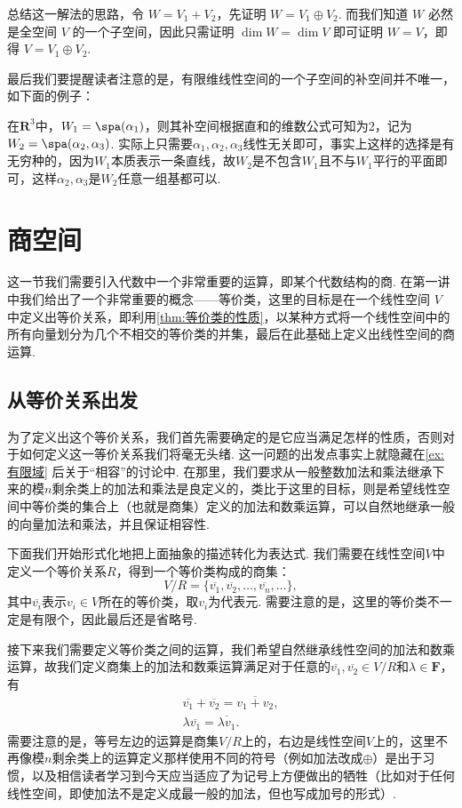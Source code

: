 总结这一解法的思路，令 $W = V_1 + V_2$，先证明 $W = V_1 \oplus V_2$. 而我们知道 $W$ 必然是全空间 $V$ 的一个子空间，因此只需证明 $\dim W = \dim V$ 即可证明 $W = V$，即得 $V = V_1 \oplus V_2$.

最后我们要提醒读者注意的是，有限维线性空间的一个子空间的补空间并不唯一，如下面的例子：
\begin{example}{}{}
    在$\mathbf{R}^3$中，$W_1=\spa(\alpha_1)$，则其补空间根据直和的维数公式可知为2，记为$W_2=\spa(\alpha_2,\alpha_3)$. 实际上只需要$\alpha_1,\alpha_2,\alpha_3$线性无关即可，事实上这样的选择是有无穷种的，因为$W_1$本质表示一条直线，故$W_2$是不包含$W_1$且不与$W_1$平行的平面即可，这样$\alpha_2,\alpha_3$是$W_2$任意一组基都可以.
\end{example}

\section{商空间}

这一节我们需要引入代数中一个非常重要的运算，即某个代数结构的商. 在第一讲中我们给出了一个非常重要的概念——等价类，这里的目标是在一个线性空间 $V$ 中定义出等价关系，即利用\autoref{thm:等价类的性质}，以某种方式将一个线性空间中的所有向量划分为几个不相交的等价类的并集，最后在此基础上定义出线性空间的商运算.

\subsection{从等价关系出发}

为了定义出这个等价关系，我们首先需要确定的是它应当满足怎样的性质，否则对于如何定义这一等价关系我们将毫无头绪. 这一问题的出发点事实上就隐藏在\autoref{ex:有限域} 后关于``相容''的讨论中. 在那里，我们要求从一般整数加法和乘法继承下来的模$n$剩余类上的加法和乘法是良定义的，类比于这里的目标，则是希望线性空间中等价类的集合上（也就是商集）定义的加法和数乘运算，可以自然地继承一般的向量加法和乘法，并且保证相容性.

下面我们开始形式化地把上面抽象的描述转化为表达式. 我们需要在线性空间$V$中定义一个等价关系$R$，得到一个等价类构成的商集：
\[V/R=\{\overline{v_1},\overline{v_2},\ldots,\overline{v_n},\ldots\},\]
其中$\overline{v_i}$表示$v_i\in V$所在的等价类，取$v_i$为代表元. 需要注意的是，这里的等价类不一定是有限个，因此最后还是省略号.

接下来我们需要定义等价类之间的运算，我们希望自然继承线性空间的加法和数乘运算，故我们定义商集上的加法和数乘运算满足对于任意的$\overline{v_1},\overline{v_2}\in V/R$和$\lambda\in\mathbf{F}$，有
\begin{equation} \label{eq:10:商集运算}
    \begin{gathered}
        \overline{v_1}+\overline{v_2}=\overline{v_1+v_2},\\
        \lambda\overline{v_1}=\overline{\lambda v_1}.
    \end{gathered}
\end{equation}
需要注意的是，等号左边的运算是商集$V/R$上的，右边是线性空间$V$上的，这里不再像模$n$剩余类上的运算定义那样使用不同的符号（例如加法改成$\oplus$）是出于习惯，以及相信读者学习到今天应当适应了为记号上方便做出的牺牲（比如对于任何线性空间，即使加法不是定义成最一般的加法，但也写成加号的形式）.

